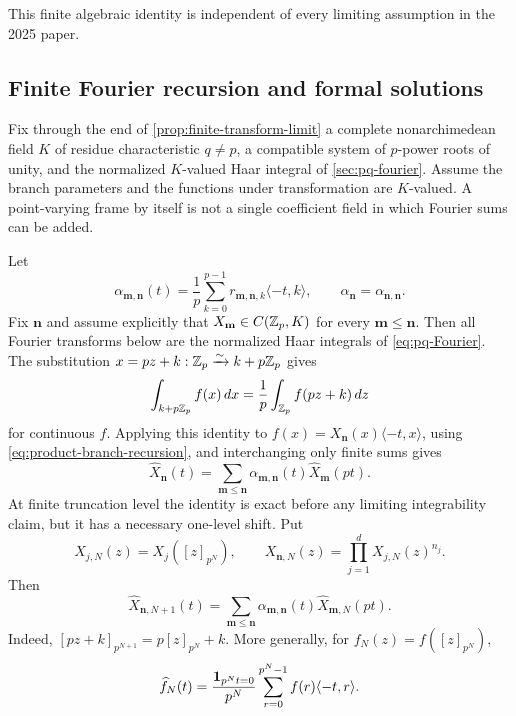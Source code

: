 This finite algebraic identity is independent of every limiting assumption
in the 2025 paper.

\subsection{Finite Fourier recursion and formal solutions}

Fix through the end of \cref{prop:finite-transform-limit} a complete
nonarchimedean field $K$ of residue
characteristic $q\ne p$, a compatible system of $p$-power roots of unity,
and the normalized $K$-valued Haar integral of
\cref{sec:pq-fourier}.  Assume the branch parameters and the functions under
transformation are $K$-valued.  A point-varying frame by itself is not a
single coefficient field in which Fourier sums can be added.

Let
\begin{equation}
\label{eq:alpha-product}
 \alpha_{\mathbf m,\mathbf n}(t)
 =\frac1p\sum_{k=0}^{p-1}
 r_{\mathbf m,\mathbf n,k}\langle-t,k\rangle,
 \qquad
 \alpha_{\mathbf n}=\alpha_{\mathbf n,\mathbf n}.
\end{equation}
Fix $\mathbf n$ and assume explicitly that
$X_{\mathbf m}\in C(\mathbb Z_p,K)$ for every $\mathbf m\leq\mathbf n$.  Then all
Fourier transforms below are the normalized Haar integrals of
\cref{eq:pq-Fourier}.  The substitution
$x=pz+k:\mathbb Z_p\xrightarrow{\sim}k+p\mathbb Z_p$ gives
\[
 \int_{k+p\mathbb Z_p}f(x)\,dx
 =\frac1p\int_{\mathbb Z_p}f(pz+k)\,dz
\]
for continuous $f$.  Applying this identity to
$f(x)=X_{\mathbf n}(x)\langle-t,x\rangle$, using
\cref{eq:product-branch-recursion}, and interchanging only finite sums gives
\begin{equation}
\label{eq:product-Fourier-recursion}
 \widehat X_{\mathbf n}(t)
 =\sum_{\mathbf m\leq\mathbf n}
 \alpha_{\mathbf m,\mathbf n}(t)
 \widehat X_{\mathbf m}(pt).
\end{equation}
At finite truncation level the identity is exact before any limiting
integrability claim, but it has a necessary one-level shift.  Put
\[
 X_{j,N}(z)=X_j([z]_{p^N}),\qquad
 X_{\mathbf n,N}(z)=\prod_{j=1}^dX_{j,N}(z)^{n_j}.
\]
Then
\begin{equation}
\label{eq:finite-product-Fourier-recursion}
 \widehat X_{\mathbf n,N+1}(t)
 =\sum_{\mathbf m\leq\mathbf n}
 \alpha_{\mathbf m,\mathbf n}(t)\widehat X_{\mathbf m,N}(pt).
\end{equation}
Indeed, $[pz+k]_{p^{N+1}}=p[z]_{p^N}+k$.  More generally, for
$f_N(z)=f([z]_{p^N})$,
\begin{equation}
\label{eq:finite-truncation-transform}
 \widehat f_N(t)=
 \frac{\mathbf 1_{p^Nt=0}}{p^N}
 \sum_{r=0}^{p^N-1}f(r)\langle-t,r\rangle.
\end{equation}

